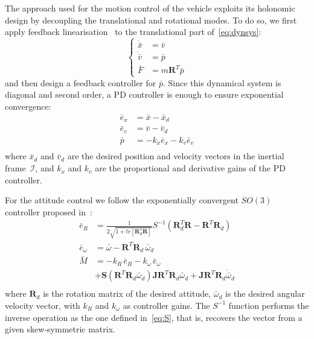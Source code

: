 \documentclass[review]{elsarticle}
\begin{document}
The approach used for the motion control of the vehicle exploits its
holonomic design by
decoupling the translational and rotational modes. To do so, we first
apply feedback linearisation~\cite{sastry99} to the translational part
of~\eqref{eq:dynsys}:
\begin{equation}
  \label{eq:fctrl}
    \left\{
    \begin{split}
      \dot{\bar{x}} &= \bar{v} \\
      \dot{\bar{v}} &= \bar{p} \\
      \bar{F} &= m \mathbf{R}^T \bar{p}
    \end{split}
  \right.
\end{equation}
and then design a feedback controller for $\bar{p}$. Since this
dynamical system is diagonal and second order, a PD controller is
enough to ensure exponential
convergence:
\begin{equation}
  \label{eq:pctrl}
  \begin{split}
    \bar{e}_x &= \bar{x} - \bar{x}_d \\
    \bar{e}_v &= \bar{v} - \bar{v}_d \\
    \bar{p} &= -k_x \bar{e}_x -k_v \bar{e}_v \\
  \end{split}
\end{equation}
where $\bar{x}_d$ and $\bar{v}_d$ are the desired position and
velocity vectors in the inertial frame~$\mathcal{I}$, and $k_x$ and
$k_v$ are the proportional and derivative gains of the PD controller.

For the attitude control we follow the exponentially convergent $SO(3)$ controller
proposed in~\cite{lee12}:
\begin{equation}
  \label{eq:mctrl}
  \begin{aligned}
    \bar{e}_R &= \frac{1}{2 \sqrt{1+tr[\mathbf{R}^T_d\mathbf{R}]} } S^{-1}( \mathbf{R}^T_d \mathbf{R} -
    \mathbf{R}^T \mathbf{R}_d ) \\
    \bar{e}_\omega &= \bar{\omega} - \mathbf{R}^T
    \mathbf{R}_d\,\bar{\omega}_d \\
    \bar{M} &= -k_R\,\bar{e}_R - k_\omega\,\bar{e}_\omega \\
    &+\mathbf{S}(\mathbf{R}^T\mathbf{R}_d\bar{\omega}_d)\mathbf{J}\mathbf{R}^T\mathbf{R}_d\bar{\omega}_d 
    +\mathbf{J}\mathbf{R}^T\mathbf{R}_d\dot{\bar{\omega}}_d \\
  \end{aligned}
\end{equation}
where $\mathbf{R}_d$ is the rotation matrix of the desired attitude,
$\bar{\omega}_d$ is the desired angular velocity vector, with $k_R$ and
$k_\omega$ as controller gains. The $S^{-1}$ function performs the inverse
operation as the one defined in~\eqref{eq:S}, that is, recovers
the vector from a given skew-symmetric matrix.
\end{document}
